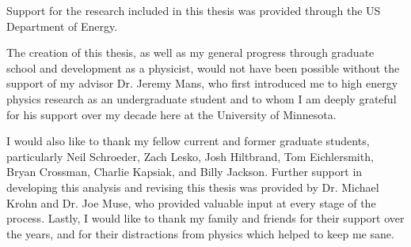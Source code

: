 
Support for the research included in this thesis was provided through the US Department of Energy. 

The creation of this thesis, as well as my general progress through graduate school and development as a physicist, would not have been possible without the support of my advisor Dr. Jeremy Mans, who first introduced me to high energy physics research as an undergraduate student and to whom I am deeply grateful for his support over my decade here at the University of Minnesota.

I would also like to thank my fellow current and former graduate students, particularly Neil Schroeder, Zach Lesko, Josh Hiltbrand, Tom Eichlersmith, Bryan Crossman, Charlie Kapsiak, and Billy Jackson.
Further support in developing this analysis and revising this thesis was provided by Dr. Michael Krohn and Dr. Joe Muse, who provided valuable input at every stage of the process. 
Lastly, I would like to thank my family and friends for their support over the years, and for their distractions from physics which helped to keep me sane. 

